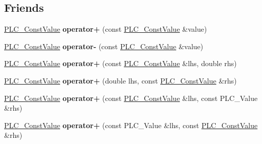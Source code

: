 \subsection*{\-Friends}
\begin{DoxyCompactItemize}
\item 
\hypertarget{classns3_1_1PLC__ConstValue_ac35ef1adfd3726d52790b015c091aa0e}{\hyperlink{classns3_1_1PLC__ConstValue}{\-P\-L\-C\-\_\-\-Const\-Value} {\bfseries operator+} (const \hyperlink{classns3_1_1PLC__ConstValue}{\-P\-L\-C\-\_\-\-Const\-Value} \&value)}\label{classns3_1_1PLC__ConstValue_ac35ef1adfd3726d52790b015c091aa0e}

\item 
\hypertarget{classns3_1_1PLC__ConstValue_a143dc0d5a16520fdf17c80cb11ee386b}{\hyperlink{classns3_1_1PLC__ConstValue}{\-P\-L\-C\-\_\-\-Const\-Value} {\bfseries operator-\/} (const \hyperlink{classns3_1_1PLC__ConstValue}{\-P\-L\-C\-\_\-\-Const\-Value} \&value)}\label{classns3_1_1PLC__ConstValue_a143dc0d5a16520fdf17c80cb11ee386b}

\item 
\hypertarget{classns3_1_1PLC__ConstValue_affd2c1970d86095d0e9ea967a77d83ec}{\hyperlink{classns3_1_1PLC__ConstValue}{\-P\-L\-C\-\_\-\-Const\-Value} {\bfseries operator+} (const \hyperlink{classns3_1_1PLC__ConstValue}{\-P\-L\-C\-\_\-\-Const\-Value} \&lhs, double rhs)}\label{classns3_1_1PLC__ConstValue_affd2c1970d86095d0e9ea967a77d83ec}

\item 
\hypertarget{classns3_1_1PLC__ConstValue_a31fea0411fdaf6d736d03d4e2d28c365}{\hyperlink{classns3_1_1PLC__ConstValue}{\-P\-L\-C\-\_\-\-Const\-Value} {\bfseries operator+} (double lhs, const \hyperlink{classns3_1_1PLC__ConstValue}{\-P\-L\-C\-\_\-\-Const\-Value} \&rhs)}\label{classns3_1_1PLC__ConstValue_a31fea0411fdaf6d736d03d4e2d28c365}

\item 
\hypertarget{classns3_1_1PLC__ConstValue_a918d0320e719ac318bab6e71e018c7f4}{\hyperlink{classns3_1_1PLC__ConstValue}{\-P\-L\-C\-\_\-\-Const\-Value} {\bfseries operator+} (const \hyperlink{classns3_1_1PLC__ConstValue}{\-P\-L\-C\-\_\-\-Const\-Value} \&lhs, const \-P\-L\-C\-\_\-\-Value \&rhs)}\label{classns3_1_1PLC__ConstValue_a918d0320e719ac318bab6e71e018c7f4}

\item 
\hypertarget{classns3_1_1PLC__ConstValue_af3e103eaba4b8d84e18288e42c883107}{\hyperlink{classns3_1_1PLC__ConstValue}{\-P\-L\-C\-\_\-\-Const\-Value} {\bfseries operator+} (const \-P\-L\-C\-\_\-\-Value \&lhs, const \hyperlink{classns3_1_1PLC__ConstValue}{\-P\-L\-C\-\_\-\-Const\-Value} \&rhs)}\label{classns3_1_1PLC__ConstValue_af3e103eaba4b8d84e18288e42c883107}


\end{DoxyCompactItemize}
